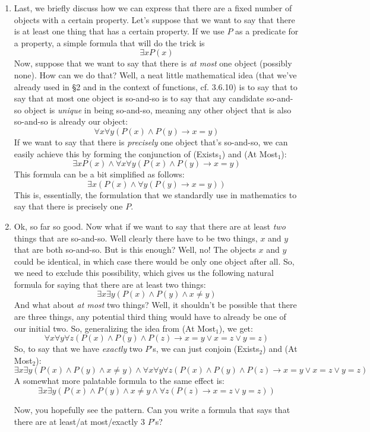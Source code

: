 \begin{enumerate}[\thesection.1]
		\item Last, we briefly discuss how we can express that there are a fixed number of objects with a certain property. Let's suppose that we want to say that there is at least one thing that has a certain property. If we use $P$ as a predicate for a property, a simple formula that will do the trick is \[\exists xP(x)\tag{Exists$_1$}\] Now, suppose that we want to say that there is \emph{at most} one object (possibly none). How can we do that? Well, a neat little mathematical idea (that we've already used in \S2 and in the context of functions, cf. 3.6.10) is to say that to say that at most one object is so-and-so is to say that any candidate so-and-so object is \emph{unique} in being so-and-so, meaning any other object that is also so-and-so is already our object: \[\forall x\forall y(P(x)\land P(y)\to x=y)\tag{At Most$_1$}\] If we want to say that there is \emph{precisely} one object that's so-and-so, we can easily achieve this by forming the conjunction of (Exists$_1$) and (At Most$_1$):\[\exists xP(x)\land \forall x\forall y(P(x)\land P(y)\to x=y)\] This formula can be a bit simplified as follows: \[\exists x(P(x)\land \forall y(P(y)\to x=y))\tag{Exactly$_1$}\] This is, essentially, the formulation that we standardly use in mathematics to say that there is precisely one $P$.
		
		\item Ok, so far so good. Now what if we want to say that there are at least \emph{two} things that are so-and-so. Well clearly there have to be two things, $x$ and $y$ that are both so-and-so. But is this enough? Well, no! The objects $x$ and $y$ could be identical, in which case there would be only one object after all. So, we need to exclude this possibility, which gives us the following natural formula for saying that there are at least two things:
		\[\exists x\exists y(P(x)\land P(y)\land x\neq y)\tag{Exists$_2$}\]
And what about \emph{at most} two things? Well, it shouldn't be possible that there are three things, any potential third thing would have to already be one of our initial two. So, generalizing the idea from (At Most$_1$), we get: \[\forall x\forall y\forall z(P(x)\land P(y)\land P(z)\to x=y\lor x=z\lor y=z)\tag{At Most$_2$}\]
So, to say that we have \emph{exactly} two $P$'s, we can just conjoin
(Exists$_2$) and (At Most$_2$):\[\exists x\exists y(P(x)\land
  P(y)\land x\neq y)\land \forall x\forall y\forall z(P(x)\land
  P(y)\land P(z)\to x=y\lor x=z\lor y=z)\] A somewhat more palatable
formula to the same effect is: \[\exists x\exists y(P(x)\land
  P(y)\land x\neq y\land \forall z(P(z)\to x=z\lor y=z))\tag{Exactly$_2$}\]
		
		Now, you hopefully see the pattern. Can you write a formula that says that there are at least/at most/exactly 3 $P$'s?

			\end{enumerate}

